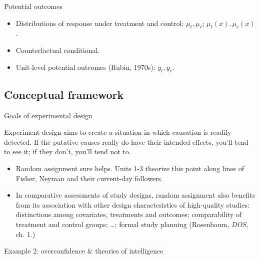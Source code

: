 \begin{frame}{Potential outcomes}
  
  \begin{itemize}[<+->]
  \item Distributions of response under treatment and control: $\mu_{t},
    \mu_{c}$; $\mu_{t}(x), \mu_{c}(x)$.
  \item Counterfactual conditional.
  \item Unit-level potential outcomes (Rubin, 1970s): $y_{t}, y_{c}$.
  \end{itemize}

\end{frame}
\subsection{Conceptual framework}
\begin{frame}{Goals of experimental design}

Experiment design aims to create a situation in which causation is
readily detected. If the putative causes
really do have their intended effects, you'll tend to see it; if they
don't, you'll tend not to.
\pause

\begin{itemize}[<+->]
\item \textrm{Random
    assignment}  sure helps. Units 1-3 theorize this point along lines
  of Fisher, Neyman and their current-day followers.
\item In comparative assessments of study designs, random assignment also benefits
  from its association with other design characteristics of
  high-quality studies:  distinctions among covariates, treatments and
  outcomes; comparability of treatment and control groups; \ldots;
  formal study planning (Rosenbaum, \textit{DOS}, ch. 1.)
\end{itemize}

\end{frame}

\begin{frame}{Example 2: overconfidence \& theories of intelligence}


\end{frame}

